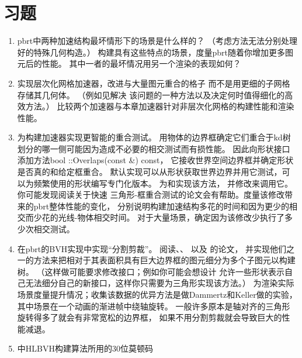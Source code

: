 \section{习题}\label{sec:习题04}

\begin{enumerate}
    \item \circletwo pbrt中两种加速结构最坏情形下的场景是什么样的？
          （考虑方法无法分别处理好的特殊几何构造。）
          构建具有这些特点的场景，度量pbrt随着你增加更多图元后的性能。
          其中一者的最坏情况用另一个渲染的表现如何？
    \item \circletwo 实现层次化网格加速器，改进与大量图元重合的格子
          而不是用更细的子网格存储其几何体。
          （例如见\citet{Jevans1989:23}解决
          该问题的一种方法以及\citet{4342587}决定何时值得细化的高效方法。）
          比较两个加速器与本章加速器针对非层次化网格的构建性能和渲染性能。
    \item \circletwo 为构建加速器实现更智能的重合测试。
          用物体的边界框确定它们重合于kd树划分的哪一侧可能因为造成不必要的相交测试而有损性能。
          因此向形状接口添加方法{\ttfamily bool ::Overlaps(const  \&) const}，
          它接收世界空间边界框并确定形状是否真的和给定框重合。
          默认实现可以从形状获取世界边界并用它测试，可以为频繁使用的形状编写专门化版本。
          为和实现该方法，
          并修改来调用它。
          你可能发现阅读\citet{doi:10.1080/10867651.2001.10487535}关于快速
          三角形-框重合测试的论文会有帮助。度量该修改带来的pbrt整体性能的变化，
          分别说明构建加速结构多花的时间和因为更少的相交而少花的光线-物体相交时间。
          对于大量场景，确定因为该修改少执行了多少次相交测试。
    \item \circletwo 在pbrt的BVH实现中实现“分割剪裁”。
          阅读\citet{4342593}、\citet{4634636}、
          \citet{10.1145/1572769.1572771}以及
          \citet{10.1145/2492045.2492055}的论文，
          并实现他们之一的方法来把相对于其表面积具有巨大边界框的图元细分为多个子图元以构建树。
          （这样做可能要求修改接口；例如你可能会想设计
          允许一些形状表示自己无法细分自己的新接口，这样你只需要为三角形实现该方法。）
          为渲染实际场景度量提升情况；收集该数据的优异方法是做Dammertz和Keller做的实验，
          其中场景在一个动画的渐进帧中绕轴旋转。
          一般许多原本是轴对齐的三角形旋转得多了就会有非常宽松的边界框，
          如果不用分割剪裁就会导致巨大的性能减退。
    \item \circletwo {}中HLBVH构建算法所用的30位莫顿码

\end{enumerate}
